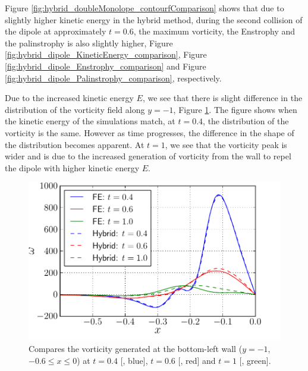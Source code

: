 
Figure  \ref{fig:hybrid_doubleMonolope_contourfComparison} shows that due to slightly higher kinetic energy in the hybrid method, during the second collision of the dipole at approximately $t=0.6$, the maximum vorticity, the Enstrophy and the palinstrophy is also slightly higher, Figure \ref{fig:hybrid_dipole_KineticEnergy_comparison}, Figure \ref{fig:hybrid_dipole_Enstrophy_comparison} and Figure \ref{fig:hybrid_dipole_Palinstrophy_comparison}, respectively. 

Due to the increased kinetic energy $E$, we see that there is slight difference in the distribution of the vorticity field along $y=-1$, Figure \ref{fig:hybrid_doubleMonopole_vorticityAtBoundary}. The figure shows when the kinetic energy of the simulations match, at $t=0.4$, the distribution of the vorticity is the same. However as time progresses, the difference in the shape of the distribution becomes apparent. At $t=1$, we see that the vorticity peak is wider and is due to the increased generation of vorticity from the wall to repel the dipole with higher kinetic energy $E$.


	\begin{figure}[!t]
	\centering
	\includegraphics[width=0.5\linewidth]{./figures/validation/cbColl/hybrid_doubleMonopole_vorticityAtBoundary.pdf}
	\caption{Compares the vorticity generated at the bottom-left wall ($y=-1$, $-0.6\leqslant x \leqslant 0$) at $t=0.4$ [{\color{plotBlue}{---}}, blue], $t=0.6$ [{\color{plotRed}{---}}, red] and $t=1$ [{\color{plotGreen}{---}}, green].}
	\label{fig:hybrid_doubleMonopole_vorticityAtBoundary}
	\end{figure}

